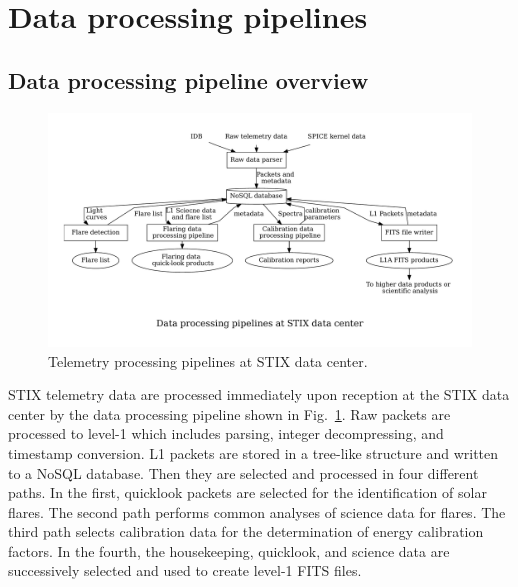 \documentclass[referee]{preaa} %
\begin{document}
\section{Data processing pipelines}
\subsection{Data processing pipeline overview}

\begin{figure}
    \centering
    \includegraphics[width=0.9\linewidth]{figures/pipelines.pdf}
    \caption{Telemetry processing pipelines at STIX data center.}
    \label{fig:main_pipelines}
\end{figure}
STIX telemetry data are processed immediately upon reception at the STIX data center by the data processing pipeline  
shown in Fig.~\ref{fig:main_pipelines}.  Raw packets are processed to
level-1 which includes parsing, integer decompressing, and timestamp conversion. 
L1 packets are stored in a tree-like structure and written to a NoSQL database. Then they are selected and processed in four different paths. 
In the first, quicklook packets are selected for the identification of solar flares. 
The second path performs common analyses of science data for flares.
The third path selects calibration data for the determination of energy calibration factors.   
In the fourth, the housekeeping, quicklook, and science data are successively selected and used to create level-1 FITS files. 
\end{document}
